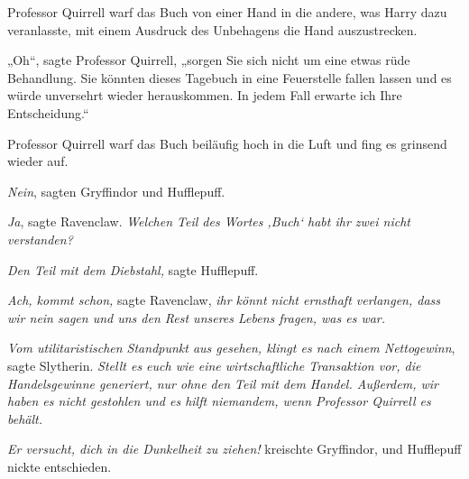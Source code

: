 Professor Quirrell warf das Buch von einer Hand in die andere, was Harry dazu veranlasste, mit einem Ausdruck des Unbehagens die Hand auszustrecken.

„Oh“, sagte Professor Quirrell, „sorgen Sie sich nicht um eine etwas rüde Behandlung. Sie könnten dieses Tagebuch in eine Feuerstelle fallen lassen und es würde unversehrt wieder herauskommen. In jedem Fall erwarte ich Ihre Entscheidung.“

Professor Quirrell warf das Buch beiläufig hoch in die Luft und fing es grinsend wieder auf.

\emph{Nein}, sagten Gryffindor und Hufflepuff.

\emph{Ja}, sagte Ravenclaw. \emph{Welchen Teil des Wortes ‚Buch‘ habt ihr zwei nicht verstanden?}

\emph{Den Teil mit dem Diebstahl,} sagte Hufflepuff.

\emph{Ach, kommt schon,} sagte Ravenclaw, \emph{ihr könnt nicht ernsthaft verlangen, dass wir nein sagen und uns den Rest unseres Lebens fragen, was es war.}

\emph{Vom utilitaristischen Standpunkt aus gesehen, klingt es nach einem Nettogewinn}, sagte Slytherin. \emph{Stellt es euch wie eine wirtschaftliche Transaktion vor, die Handelsgewinne generiert, nur ohne den Teil mit dem Handel. Außerdem, \emph{wir} haben es nicht gestohlen und es hilft niemandem, wenn Professor Quirrell es behält.}

\emph{Er versucht, dich in die Dunkelheit zu ziehen!} kreischte Gryffindor, und Hufflepuff nickte entschieden.

